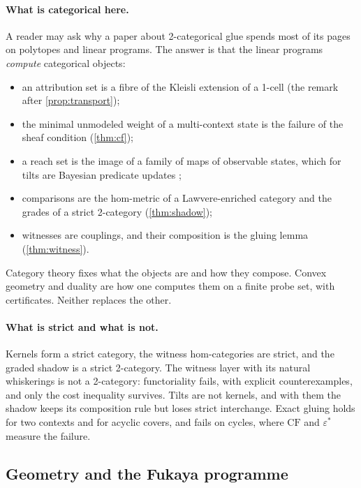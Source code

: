 \documentclass[11pt]{article}
\theoremstyle{definition}
\theoremstyle{remark}
\begin{document}
\paragraph{What is categorical here.} A reader may ask why a paper about 2-categorical glue spends
most of its pages on polytopes and linear programs. The answer is that the linear programs
\emph{compute} categorical objects:
\begin{itemize}[leftmargin=*]
\item an attribution set is a fibre of the Kleisli extension of a 1-cell (the remark after
  \cref{prop:transport});
\item the minimal unmodeled weight of a multi-context state is the failure of the sheaf condition
  (\cref{thm:cf});
\item a reach set is the image of a family of maps of observable states, which for tilts are
  Bayesian predicate updates \cite{JacobsZanasi2016};
\item comparisons are the hom-metric of a Lawvere-enriched category and the grades of a strict
  2-category (\cref{thm:shadow});
\item witnesses are couplings, and their composition is the gluing lemma (\cref{thm:witness}).
\end{itemize}
Category theory fixes what the objects are and how they compose. Convex geometry and duality are how
one computes them on a finite probe set, with certificates. Neither replaces the other.

\paragraph{What is strict and what is not.} Kernels form a strict category, the witness
hom-categories are strict, and the graded shadow is a strict 2-category. The witness layer with its
natural whiskerings is not a 2-category: functoriality fails, with explicit counterexamples, and only
the cost inequality survives. Tilts are not kernels, and with them the shadow keeps its composition
rule but loses strict interchange. Exact gluing holds for two contexts and for acyclic covers, and
fails on cycles, where $\mathrm{CF}$ and $\varepsilon^*$ measure the failure.

\subsection{Geometry and the Fukaya programme}\label{sec:fukaya}
\end{document}
